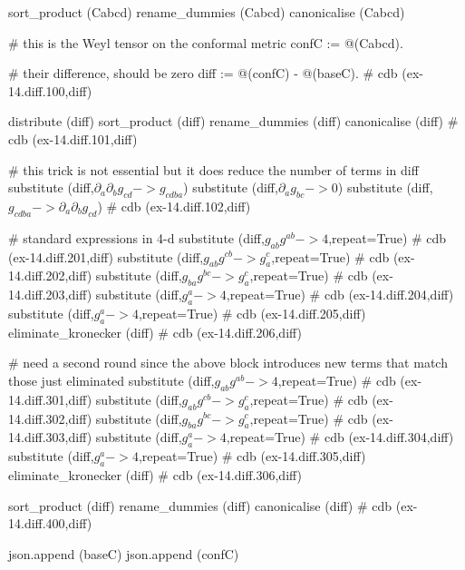\documentclass[12pt]{cdblatex}
\begin{document}
\begin{cadabra}
   sort_product   (Cabcd)
   rename_dummies (Cabcd)
   canonicalise   (Cabcd)

   # this is the Weyl tensor on the conformal metric
   confC := @(Cabcd).

   # their difference, should be zero
   diff := @(confC) - \phi @(baseC).  # cdb (ex-14.diff.100,diff)

   distribute     (diff)
   sort_product   (diff)
   rename_dummies (diff)
   canonicalise   (diff)  # cdb (ex-14.diff.101,diff)

   # this trick is not essential but it does reduce the number of terms in diff
   substitute     (diff,$\partial_{a}{\partial_{b}{g_{c d}}} -> g_{c d b a}$)
   substitute     (diff,$\partial_{a}{g_{b c}} -> 0$)
   substitute     (diff,$g_{c d b a} -> \partial_{a}{\partial_{b}{g_{c d}}}$)  # cdb (ex-14.diff.102,diff)

   # standard expressions in 4-d
   substitute     (diff,$g_{a b} g^{a b} -> 4$,repeat=True)          # cdb (ex-14.diff.201,diff)
   substitute     (diff,$g_{a b} g^{c b} -> g_{a}^{c}$,repeat=True)  # cdb (ex-14.diff.202,diff)
   substitute     (diff,$g_{b a} g^{b c} -> g_{a}^{c}$,repeat=True)  # cdb (ex-14.diff.203,diff)
   substitute     (diff,$g_{a}^{a} -> 4$,repeat=True)                # cdb (ex-14.diff.204,diff)
   substitute     (diff,$g^{a}_{a} -> 4$,repeat=True)                # cdb (ex-14.diff.205,diff)
   eliminate_kronecker (diff)                                        # cdb (ex-14.diff.206,diff)

   # need a second round since the above block introduces new terms that match those just eliminated
   substitute     (diff,$g_{a b} g^{a b} -> 4$,repeat=True)          # cdb (ex-14.diff.301,diff)
   substitute     (diff,$g_{a b} g^{c b} -> g_{a}^{c}$,repeat=True)  # cdb (ex-14.diff.302,diff)
   substitute     (diff,$g_{b a} g^{b c} -> g_{a}^{c}$,repeat=True)  # cdb (ex-14.diff.303,diff)
   substitute     (diff,$g_{a}^{a} -> 4$,repeat=True)                # cdb (ex-14.diff.304,diff)
   substitute     (diff,$g^{a}_{a} -> 4$,repeat=True)                # cdb (ex-14.diff.305,diff)
   eliminate_kronecker (diff)                                        # cdb (ex-14.diff.306,diff)

   sort_product   (diff)
   rename_dummies (diff)
   canonicalise   (diff)  # cdb (ex-14.diff.400,diff)

   json.append (baseC)
   json.append (confC)
\end{cadabra}

\clearpage
\end{document}
